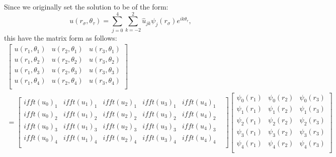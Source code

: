 Since we originally set the solution to be of the form:
\begin{equation}
u(r_\sigma, \theta_\tau) = \sum_{j = 0}^{4}\sum_{k = -2}^{2} \hat u_{jk}\psi_j(r_\sigma)e^{ik\theta_\tau},
\end{equation}
this have the matrix form as follows:
\begin{eqnarray}
\begin{bmatrix}
    u(r_1, \theta_1)&u(r_2, \theta_1)&u(r_3, \theta_1) \\
    u(r_1, \theta_2)&u(r_2, \theta_2)&u(r_3, \theta_2) \\
    u(r_1, \theta_3)&u(r_2, \theta_3)&u(r_3, \theta_3) \\
    u(r_1, \theta_4)&u(r_2, \theta_4)&u(r_3, \theta_4) \\
\end{bmatrix} \\
=
\begin{bmatrix}
    ifft(u_0)_1 & ifft(u_1)_1 & ifft(u_2)_1 & ifft(u_3)_1 & ifft(u_4)_1 & \\
    ifft(u_0)_2 & ifft(u_1)_2 & ifft(u_2)_2 & ifft(u_3)_2 & ifft(u_4)_2 & \\
    ifft(u_0)_3 & ifft(u_1)_3 & ifft(u_2)_3 & ifft(u_3)_3 & ifft(u_4)_3 & \\
    ifft(u_0)_4 & ifft(u_1)_4 & ifft(u_2)_4 & ifft(u_3)_4 & ifft(u_4)_4 & \\
\end{bmatrix}
\begin{bmatrix}
    \psi_0(r_1) & \psi_0(r_2) & \psi_0(r_3) \\
    \psi_1(r_1) & \psi_1(r_2) & \psi_1(r_3) \\
    \psi_2(r_1) & \psi_2(r_2) & \psi_2(r_3) \\
    \psi_3(r_1) & \psi_3(r_2) & \psi_3(r_3) \\
    \psi_4(r_1) & \psi_4(r_2) & \psi_4(r_3) \\
\end{bmatrix}
\end{eqnarray}
